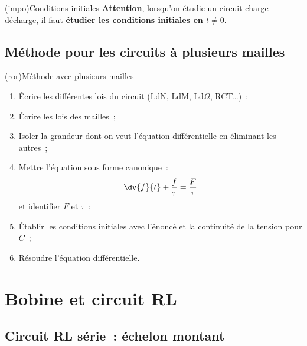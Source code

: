 \documentclass[../../main/main.tex]{subfiles}
\begin{document}
\begin{tcb*}(impo){Conditions initiales}
	\textbf{Attention}, lorsqu'on étudie un circuit charge-décharge, il faut
	\textbf{étudier les conditions initiales en $\boxed{t \neq 0}$}.
\end{tcb*}

\subsection{Méthode pour les circuits à plusieurs mailles}
\begin{tcb*}[breakable](ror){Méthode avec plusieurs mailles}
	\begin{enumerate}[label=\sqenumi]
		\item Écrire les différentes lois du circuit (LdN, LdM, Ld$\Omega$, RCT…)~;
		\item Écrire les lois des mailles~;
		\item Isoler la grandeur dont on veut l'équation différentielle en éliminant
		      les autres~;
		\item Mettre l'équation sous forme canonique~:
		      \[
			      \dv{f}{t} + \frac{f}{\tau} = \frac{F}{\tau}
		      \]
		      et identifier $F$ et $\tau$~;
		\item Établir les conditions initiales avec l'énoncé et la continuité de la
		      tension pour $C$~;
		\item Résoudre l'équation différentielle.
	\end{enumerate}
\end{tcb*}

\section{Bobine et circuit RL}
\subsection{Circuit RL série~: échelon montant}
\end{document}
